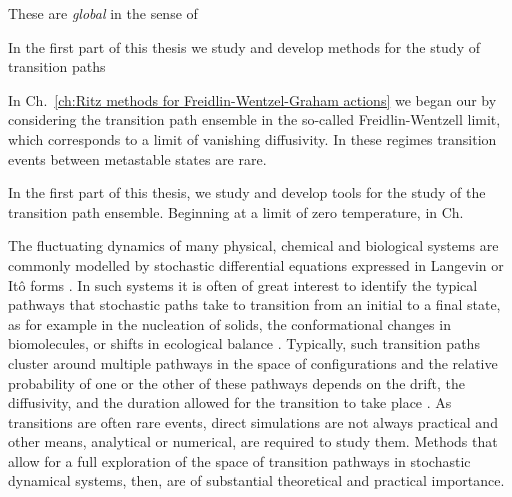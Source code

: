 \documentclass[]{cam-thesis}
\begin{document}
These are \textit{global} in the sense of

In the first part of this thesis we study and develop methods for the study of transition paths

In Ch.~\ref{ch:Ritz methods for Freidlin-Wentzel-Graham actions} we began our by considering the transition path ensemble in the so-called Freidlin-Wentzell limit, which corresponds to a limit of vanishing diffusivity. {\color{red} In these regimes transition events between metastable states are rare.}

In the first part of this thesis, we study and develop tools for the study of the transition path ensemble. Beginning at a limit of zero temperature, in Ch.




The fluctuating dynamics of many physical, chemical and biological
systems are commonly modelled by stochastic differential equations
expressed in Langevin or Itô forms \citep{kampenStochasticProcessesPhysics2011a, gardinerStochasticMethodsHandbook2010a, riskenFokkerPlanckEquationMethods2012a, bharucha-reidElementsTheoryMarkov2012a}.
In such systems it is often of great interest to identify the typical
pathways that stochastic paths take to transition from an initial
to a final state, as for example in the nucleation of solids, the
conformational changes in biomolecules, or shifts in ecological balance
\citep{faccioliDominantPathwaysProtein2006a, demarcoPhaseTransitionModel2001a, gardnerConstructionGeneticToggle2000a, mangelBarrierTransitionsDriven1994a, wolynesNavigatingFoldingRoutes1995a, huangMolecularMathematicalBasis2012a, paninskiMostLikelyVoltage2006a, noltingBallsCupsQuasipotentials2016a, leeFindingMultipleReaction2017a}.
Typically, such transition paths cluster around multiple pathways
in the space of configurations and the relative probability of one
or the other of these pathways depends on the drift, the diffusivity,
and the duration allowed for the transition to take place \citep{onsagerFluctuationsIrreversibleProcesses1953a, bachFunctionalsPathsDiffusion1977a, itoProbabilisticConstructionLagrangean1978b, ikedaStochasticDifferentialEquations2014a}.
As transitions are often rare events, direct simulations are not always
practical and other means, analytical or numerical, are required to
study them. Methods that allow for a full exploration of the space
of transition pathways in stochastic dynamical systems, then, are
of substantial theoretical and practical importance.
\end{document}
